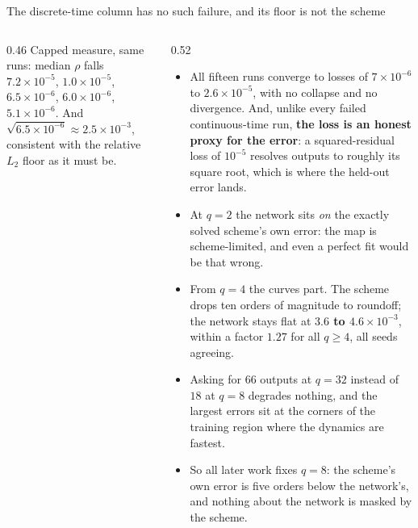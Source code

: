 \documentclass[aspectratio=169,10pt]{beamer}
\newcommand{\hl}[1]{{\color{accent}\textbf{#1}}}
\begin{document}
\begin{frame}[shrink=25]{The discrete-time column has no such failure, and its floor is not the scheme}
\begin{columns}[T]
\begin{column}{0.46\textwidth}
      {\small Capped measure, same runs: median $\rho$ falls $7.2\times10^{-5}$,
       $1.0\times10^{-5}$, $6.5\times10^{-6}$, $6.0\times10^{-6}$,
       $5.1\times10^{-6}$. And $\sqrt{6.5\times10^{-6}} \approx 2.5\times10^{-3}$,
       consistent with the relative $L_2$ floor as it must be.}
    \end{column}
    \begin{column}{0.52\textwidth}
      \begin{itemize}\small
        \item All fifteen runs converge to losses of $7\times10^{-6}$ to
              $2.6\times10^{-5}$, with no collapse and no divergence. And,
              unlike every failed continuous-time run, \hl{the loss is an honest
              proxy for the error}: a squared-residual loss of $10^{-5}$
              resolves outputs to roughly its square root, which is where the
              held-out error lands.
        \item At $q = 2$ the network sits \emph{on} the exactly solved scheme's
              own error: the map is scheme-limited, and even a perfect fit would
              be that wrong.
        \item From $q = 4$ the curves part. The scheme drops ten orders of
              magnitude to roundoff; the network stays flat at
              \hl{$3.6$ to $4.6\times10^{-3}$}, within a factor $1.27$ for all
              $q \ge 4$, all seeds agreeing.
        \item Asking for $66$ outputs at $q = 32$ instead of $18$ at $q = 8$
              degrades nothing, and the largest errors sit at the corners of the
              training region where the dynamics are fastest.
        \item So all later work fixes $q = 8$: the scheme's own error is five
              orders below the network's, and nothing about the network is
              masked by the scheme.
      \end{itemize}
    \end{column}
  \end{columns}
\end{frame}
\end{document}
